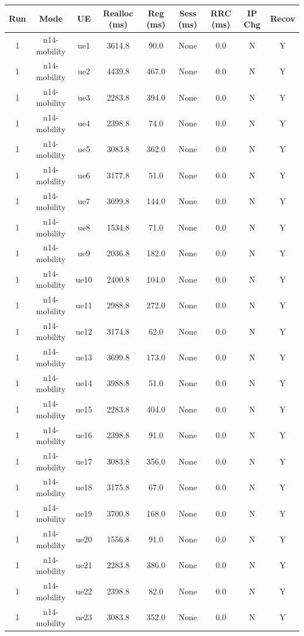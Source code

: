 \begin{table}[ht]
\centering
\begin{tabular}{|c|c|c|c|c|c|c|c|c|}
\hline
Run & Mode & UE & Realloc (ms) & Reg (ms) & Sess (ms) & RRC (ms) & IP Chg & Recov \\
\hline
1 & n14-mobility & ue1 & 3614.8 & 90.0 & None & 0.0 & N & Y \\
1 & n14-mobility & ue2 & 4439.8 & 467.0 & None & 0.0 & N & Y \\
1 & n14-mobility & ue3 & 2283.8 & 394.0 & None & 0.0 & N & Y \\
1 & n14-mobility & ue4 & 2398.8 & 74.0 & None & 0.0 & N & Y \\
1 & n14-mobility & ue5 & 3083.8 & 362.0 & None & 0.0 & N & Y \\
1 & n14-mobility & ue6 & 3177.8 & 51.0 & None & 0.0 & N & Y \\
1 & n14-mobility & ue7 & 3699.8 & 144.0 & None & 0.0 & N & Y \\
1 & n14-mobility & ue8 & 1534.8 & 71.0 & None & 0.0 & N & Y \\
1 & n14-mobility & ue9 & 2036.8 & 182.0 & None & 0.0 & N & Y \\
1 & n14-mobility & ue10 & 2400.8 & 104.0 & None & 0.0 & N & Y \\
1 & n14-mobility & ue11 & 2988.8 & 272.0 & None & 0.0 & N & Y \\
1 & n14-mobility & ue12 & 3174.8 & 62.0 & None & 0.0 & N & Y \\
1 & n14-mobility & ue13 & 3699.8 & 173.0 & None & 0.0 & N & Y \\
1 & n14-mobility & ue14 & 3988.8 & 51.0 & None & 0.0 & N & Y \\
1 & n14-mobility & ue15 & 2283.8 & 404.0 & None & 0.0 & N & Y \\
1 & n14-mobility & ue16 & 2398.8 & 91.0 & None & 0.0 & N & Y \\
1 & n14-mobility & ue17 & 3083.8 & 356.0 & None & 0.0 & N & Y \\
1 & n14-mobility & ue18 & 3175.8 & 67.0 & None & 0.0 & N & Y \\
1 & n14-mobility & ue19 & 3700.8 & 168.0 & None & 0.0 & N & Y \\
1 & n14-mobility & ue20 & 1556.8 & 91.0 & None & 0.0 & N & Y \\
1 & n14-mobility & ue21 & 2283.8 & 386.0 & None & 0.0 & N & Y \\
1 & n14-mobility & ue22 & 2398.8 & 82.0 & None & 0.0 & N & Y \\
1 & n14-mobility & ue23 & 3083.8 & 352.0 & None & 0.0 & N & Y \\

\end{tabular}
\end{table}
